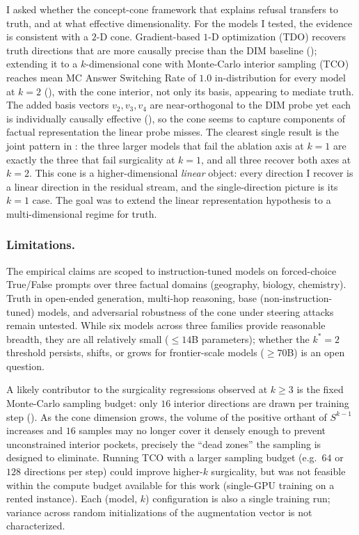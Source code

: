 \documentclass[sn-basic]{sn-jnl}
\begin{document}
I asked whether the concept-cone framework that explains refusal transfers to
truth, and at what effective dimensionality. For the models I tested, the
evidence is consistent with a $2$-D cone. Gradient-based $1$-D optimization
(TDO) recovers truth directions that are more causally precise than the DIM
baseline (); extending it to a $k$-dimensional cone with
Monte-Carlo interior sampling (TCO) reaches mean MC Answer Switching Rate of
$1.0$ in-distribution for every model at $k=2$ (), with the
cone interior, not only its basis, appearing to mediate truth. The added
basis vectors $v_2, v_3, v_4$ are near-orthogonal to the DIM probe yet each is
individually causally effective (), so the cone seems to
capture components of factual representation the linear probe misses. The
clearest single result is the joint pattern in : the three larger
models that fail the ablation axis at $k=1$ are exactly the three that fail
surgicality at $k=1$, and all three recover both axes at $k=2$. This cone is a
higher-dimensional \emph{linear} object: every direction I recover is a linear
direction in the residual stream, and the single-direction picture is its $k =
1$ case. The goal was to extend the linear representation hypothesis to a
multi-dimensional regime for truth.

\subsubsection*{Limitations.}
The empirical claims are scoped to instruction-tuned models on forced-choice
True/False prompts over three factual domains (geography, biology, chemistry).
Truth in open-ended generation, multi-hop reasoning, base (non-instruction-tuned)
models, and adversarial robustness of the cone under steering attacks remain
untested. While six models across three families provide reasonable breadth, they
are all relatively small ($\le 14$B parameters); whether the $k^{*}=2$ threshold
persists, shifts, or grows for frontier-scale models ($\ge 70$B) is an open
question.

A likely contributor to the surgicality regressions observed at $k \ge 3$ is the
fixed Monte-Carlo sampling budget: only $16$ interior directions are drawn per
training step (). As the cone dimension grows, the volume
of the positive orthant of $S^{k-1}$ increases and $16$ samples may no longer
cover it densely enough to prevent unconstrained interior pockets, precisely
the ``dead zones'' the sampling is designed to eliminate. Running TCO with a
larger sampling budget (e.g.\ $64$ or $128$ directions per step) could improve
higher-$k$ surgicality, but was not feasible within the compute budget available
for this work (single-GPU training on a rented instance). Each (model, $k$)
configuration is also a single training run; variance across random
initializations of the augmentation vector is not characterized.
\end{document}
